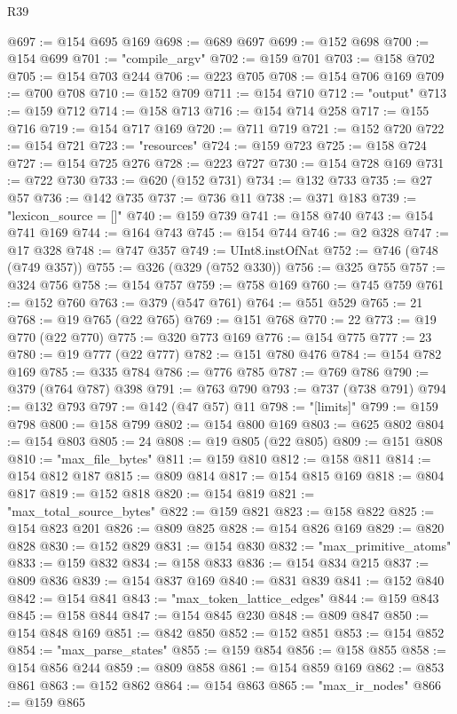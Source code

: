 \begin{lexlean}{R39}
\begin{coremodule}
@697 := @154 @695 @169
@698 := @689 @697
@699 := @152 @698
@700 := @154 @699
@701 := "compile_argv"
@702 := @159 @701
@703 := @158 @702
@705 := @154 @703 @244
@706 := @223 @705
@708 := @154 @706 @169
@709 := @700 @708
@710 := @152 @709
@711 := @154 @710
@712 := "output"
@713 := @159 @712
@714 := @158 @713
@716 := @154 @714 @258
@717 := @155 @716
@719 := @154 @717 @169
@720 := @711 @719
@721 := @152 @720
@722 := @154 @721
@723 := "resources"
@724 := @159 @723
@725 := @158 @724
@727 := @154 @725 @276
@728 := @223 @727
@730 := @154 @728 @169
@731 := @722 @730
@733 := @620 (@152 @731)
@734 := @132 @733
@735 := @27 @57
@736 := @142 @735
@737 := @736 @11
@738 := @371 @183
@739 := "lexicon_source = []"
@740 := @159 @739
@741 := @158 @740
@743 := @154 @741 @169
@744 := @164 @743
@745 := @154 @744
@746 := @2 @328
@747 := @17 @328
@748 := @747 @357
@749 := UInt8.instOfNat
@752 := @746 (@748 (@749 @357))
@755 := @326 (@329 (@752 @330))
@756 := @325 @755
@757 := @324 @756
@758 := @154 @757
@759 := @758 @169
@760 := @745 @759
@761 := @152 @760
@763 := @379 (@547 @761)
@764 := @551 @529
@765 := 21
@768 := @19 @765 (@22 @765)
@769 := @151 @768
@770 := 22
@773 := @19 @770 (@22 @770)
@775 := @320 @773 @169
@776 := @154 @775
@777 := 23
@780 := @19 @777 (@22 @777)
@782 := @151 @780 @476
@784 := @154 @782 @169
@785 := @335 @784
@786 := @776 @785
@787 := @769 @786
@790 := @379 (@764 @787) @398
@791 := @763 @790
@793 := @737 (@738 @791)
@794 := @132 @793
@797 := @142 (@47 @57) @11
@798 := "[limits]"
@799 := @159 @798
@800 := @158 @799
@802 := @154 @800 @169
@803 := @625 @802
@804 := @154 @803
@805 := 24
@808 := @19 @805 (@22 @805)
@809 := @151 @808
@810 := "max_file_bytes"
@811 := @159 @810
@812 := @158 @811
@814 := @154 @812 @187
@815 := @809 @814
@817 := @154 @815 @169
@818 := @804 @817
@819 := @152 @818
@820 := @154 @819
@821 := "max_total_source_bytes"
@822 := @159 @821
@823 := @158 @822
@825 := @154 @823 @201
@826 := @809 @825
@828 := @154 @826 @169
@829 := @820 @828
@830 := @152 @829
@831 := @154 @830
@832 := "max_primitive_atoms"
@833 := @159 @832
@834 := @158 @833
@836 := @154 @834 @215
@837 := @809 @836
@839 := @154 @837 @169
@840 := @831 @839
@841 := @152 @840
@842 := @154 @841
@843 := "max_token_lattice_edges"
@844 := @159 @843
@845 := @158 @844
@847 := @154 @845 @230
@848 := @809 @847
@850 := @154 @848 @169
@851 := @842 @850
@852 := @152 @851
@853 := @154 @852
@854 := "max_parse_states"
@855 := @159 @854
@856 := @158 @855
@858 := @154 @856 @244
@859 := @809 @858
@861 := @154 @859 @169
@862 := @853 @861
@863 := @152 @862
@864 := @154 @863
@865 := "max_ir_nodes"
@866 := @159 @865

\end{coremodule}
\end{lexlean}

